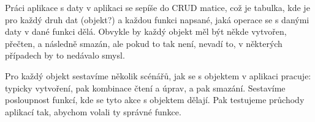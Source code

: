 Práci aplikace s daty v aplikaci se sepíše do CRUD matice, což je tabulka, kde je pro každý druh dat (objekt?) a každou funkci napsané, jaká operace se s danými daty v dané funkci dělá. Obvykle by každý objekt měl být někde vytvořen, přečten, a následně smazán, ale pokud to tak není, nevadí to, v některých případech by to nedávalo smysl.

Pro každý objekt sestavíme několik scénářů, jak se s objektem v aplikaci pracuje: typicky vytvoření, pak kombinace čtení a úprav, a pak smazání. Sestavíme posloupnost funkcí, kde se tyto akce s objektem dělají. Pak testujeme průchody aplikací tak, abychom volali ty správné funkce.